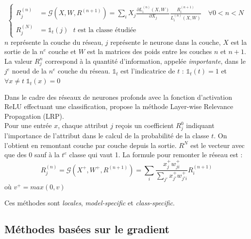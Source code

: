 \documentclass{report}
\begin{document}
        $$\left\{
        \begin{array}{rl}
            R^{(n)}_j &= \mathcal{G}(X,W,R^{(n+1)}) = \sum_{i}X_j\frac{\partial L_i^{(n)}(X,W)}{\partial X_j}\frac{R_i^{(n+1)}}{L_i^{(n)}(X,W)} \quad \forall 0< n <N\\
            R_j^{(N)} &= \mathbb{1}_{t}(j) \text{ $t$ est la classe étudiée}
        \end{array}\right.
        $$
        $n$ représente la couche du réseau, $j$ représente le neurone dans la couche, $X$ est la sortie de la $n^e$ couche et $W$ est la matrices des poids entre les couches $n$ et $n+1$. La valeur $R_j^n$ correspond à la quantité d'information, appelée \emph{importante}, dans le $j^e$ noeud de la $n^e$ couche du réseau. $\mathbb{1}_{t}$ est l'indicatrice de $t$ : $\mathbb{1}_{t}(t) = 1$ et $\forall x\not= t\; \mathbb{1}_{t}(x) = 0$
        
        Dans le cadre des réseaux de neurones profonds avec la fonction d'activation ReLU effectuant une classification, \cite{montavon_layer-wise_2019} propose la méthode Layer-wise Relevance Propagation (LRP).\\
        Pour une entrée $x$, chaque attribut $j$ reçois un coefficient $R_j^0$ indiquant l'importance de l'attribut dans le calcul de la probabilité de la classe $t$. On l'obtient en remontant couche par couche depuis la sortie. $R^N$ est le vecteur avec que des 0 sauf à la $t^e$ classe qui vaut 1. La formule pour remonter le réseau est :
        $$
        R^{(n)}_j = \mathcal{G}(X^+, W^+, R^{(n+1)}) = \sum_i \frac{x_j^+ w_{ji}^+}{\sum_{j'} x_{j'}^+ w_{j'i}^+} R_i^{(n+1)}
        $$
        où $v^+ = max(0,v)$
        
        Ces méthodes sont \emph{locales}, \emph{model-specific} et \emph{class-specific}.
        
    \subsection{Méthodes basées sur le gradient}
        
\end{document}
